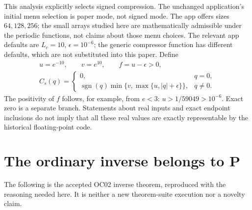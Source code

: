 \documentclass[11pt,a4paper]{article}
\theoremstyle{definition}
\theoremstyle{remark}\newtheorem{remark}[theorem]{Remark}
\DeclareMathOperator{\sgn}{sgn}
\numberwithin{equation}{section}
\begin{document}
This analysis explicitly selects signed compression. The unchanged application's
initial menu selection is paper mode, not signed mode. The app offers sizes
$64,128,256$; the small arrays studied here are mathematically admissible under
the periodic functions, not claims about those menu choices.
The relevant app defaults are $L_c=10$, $\epsilon=10^{-6}$; the generic compressor
function has different defaults, which are not substituted into this paper.
Define
\begin{equation}\label{eq:Cs}
\begin{gathered}
 u=e^{-10},\qquad v=e^{10},\qquad f=u-\epsilon>0,\\
 C_s(q)=
 \begin{cases}
 0,&q=0,\\
 \sgn(q)\min\{v,\max\{u,|q|+\epsilon\}\},&q\ne0.
 \end{cases}
\end{gathered}
\end{equation}
The positivity of $f$ follows, for example, from $e<3$:
$u>1/59049>10^{-6}$. Exact zero is a separate branch.
Statements about real inputs and exact endpoint inclusions do not imply that all
these real values are exactly representable by the historical floating-point code.

\section{The ordinary inverse belongs to P}\label{sec:inverse}
The following is the accepted OC02 inverse theorem, reproduced with the reasoning
needed here. It is neither a new theorem-suite execution nor a novelty claim.
\end{document}
